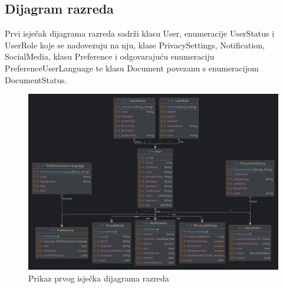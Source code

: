 \subsection{Dijagram razreda}

Prvi isječak dijagrama razreda sadrži klasu User, enumeracije UserStatus i UserRole koje se nadovezuju na nju, klase PrivacySettings, Notification, SocialMedia, klasu Preference i odgovarajuću enumeraciju PreferenceUserLanguage te klasu Document povezanu s enumeracijom DocumentStatus.
\begin{figure} [H]

	\includegraphics[width=1\linewidth]{slike/ClassDiagram1.png}
	\centering
	\caption{Prikaz prvog isječka dijagrama razreda}
	\label{fig:Prikaz prvog isječka dijagrama razreda}
\end{figure}

